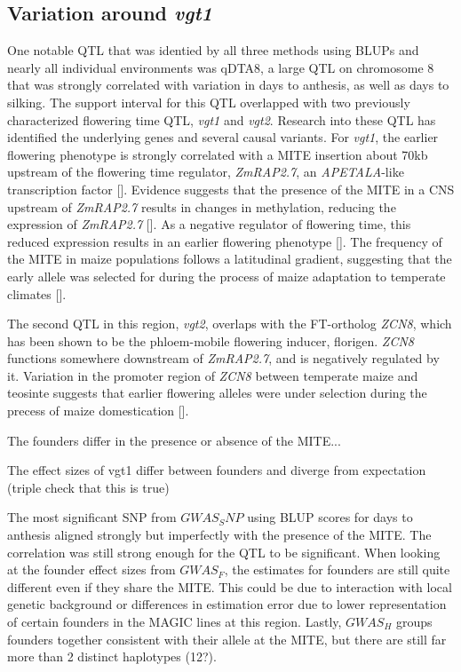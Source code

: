 \documentclass[article,9pt,twocolumn,twoside]{rilabRxiv}
\begin{document}
\subsection{Variation around \emph{vgt1}}
One notable QTL that was identied by all three methods using BLUPs and nearly all individual environments was qDTA8, a large QTL on chromosome 8 that was strongly correlated with variation in days to anthesis, as well as days to silking. The support interval for this QTL overlapped with two previously characterized flowering time QTL, \emph{vgt1} and \emph{vgt2}. Research into these QTL has identified the underlying genes and several causal variants. For \emph{vgt1}, the earlier flowering phenotype is strongly correlated with a MITE insertion about 70kb upstream of the flowering time regulator, \emph{ZmRAP2.7}, an \emph{APETALA}-like transcription factor []. Evidence suggests that the presence of the MITE in a CNS upstream of \emph{ZmRAP2.7} results in changes in methylation, reducing the expression of \emph{ZmRAP2.7} []. As a negative regulator of flowering time, this reduced expression results in an earlier flowering phenotype []. The frequency of the MITE in maize populations follows a latitudinal gradient, suggesting that the early allele was selected for during the process of maize adaptation to temperate climates [].

The second QTL in this region, \emph{vgt2}, overlaps with the FT-ortholog \emph{ZCN8}, which has been shown to be the phloem-mobile flowering inducer, florigen. \emph{ZCN8} functions somewhere downstream of \emph{ZmRAP2.7}, and is negatively regulated by it. Variation in the promoter region of \emph{ZCN8} between temperate maize and teosinte suggests that earlier flowering alleles were under selection during the precess of maize domestication [].

The founders differ in the presence or absence of the MITE...

The effect sizes of vgt1 differ between founders and diverge from expectation (triple check that this is true)

The most significant SNP from $GWAS_SNP$ using BLUP scores for days to anthesis aligned strongly but imperfectly with the presence of the MITE. The correlation was still strong enough for the QTL to be significant. When looking at the founder effect sizes from $GWAS_F$, the estimates for founders are still quite different even if they share the MITE. This could be due to interaction with local genetic background or differences in estimation error due to lower representation of certain founders in the MAGIC lines at this region. Lastly, $GWAS_H$ groups founders together consistent with their allele at the MITE, but there are still far more than 2 distinct haplotypes (12?).
\end{document}
